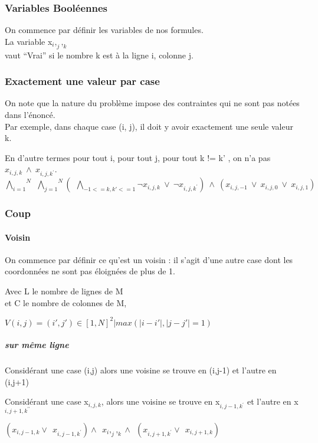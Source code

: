 \documentclass[utf8]{article}
\begin{document}
\subsubsection{Variables  Booléennes}

On commence par définir les variables de nos formules.
\\La variable x$_i,_j,_k$
\\vaut “Vrai” si le nombre k est à la ligne i, colonne j.

\subsubsection{Exactement une valeur par case}
On note que la nature du problème impose des contraintes qui ne sont pas notées dans l’énoncé.
\\Par exemple, dans chaque case (i, j), il doit y avoir exactement une seule valeur k.

En d’autre termes pour tout i,
pour tout j, pour tout k != k'
, on n’a pas $x_{i,j,k} ~ \land ~ x_{i,j,{k^\prime}}$.
\newline
$\overset{N}{\underset{i=1}{\bigwedge}}
~~\overset{N}{\underset{j=1}{\bigwedge}}
(
~~\underset{-1<={k,k'}<=1}{\bigwedge}
\neg x_{i,j,k} ~ \lor ~ \neg x_{i,j,{k^\prime}})
 ~ \land ~ (x_{i,j,-1} ~ \lor ~ x_{i,j,0} ~ \lor ~ x_{i,j,1})$
\subsubsection{Coup}

\paragraph{Voisin}
On commence par définir ce qu’est un voisin : il s’agit d’une autre case dont les coordonnées ne sont pas éloignées de plus de 1.

Avec L le nombre de lignes de M
\\et C le nombre de colonnes de M,

$V (i, j) = {(i', j') \in [1, N]^2| max(|i - i'|, |j - j'| = 1)}$


\subparagraph{sur même ligne}
Considérant une case (i,j)
alors une voisine se trouve en (i,j-1)
et l'autre en (i,j+1)

Considérant une case x$_{i,j,k}$, alors une voisine se trouve en x$_{i,j-1,k^\prime}$ et l'autre en x$_{i,j+1,k^{\prime\prime}}$

$(x_{i,j-1,k} \lor ~~ x_{i,j-1,k^\prime} )
\land ~~
x_i,_j,_k
\land ~~
(x_{i,j+1,k^\prime} \lor ~~ x_{i,j+1,k})$
\end{document}
